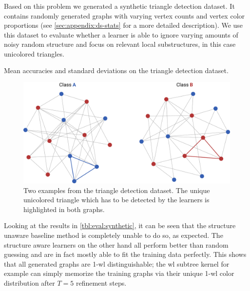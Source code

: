 Based on this problem we generated a synthetic triangle detection dataset.
It contains randomly generated graphs with varying vertex counts and vertex color proportions (see \cref{sec:appendix:ds-stats} for a more detailed description).
We use this dataset to evaluate whether a learner is able to ignore varying amounts of noisy random structure and focus on relevant local substructures, in this case unicolored triangles.
\begin{table}[t]
	\caption{Mean accuracies and standard deviations on the triangle detection dataset.}\label{tbl:eval:synthetic}
	\centering
\end{table}
\begin{figure}[t]
	\centering
	\includegraphics[width=0.7\linewidth]{gfx/evaluation/triangle-problem.pdf}
	\caption[Two example graphs from the triangle detection dataset.]{
		Two examples from the triangle detection dataset.
		The unique unicolored triangle which has to be detected by the learners is highlighted in both graphs.
	}\label{fig:evaluation:triangle-problem}
\end{figure}
Looking at the results in \cref{tbl:eval:synthetic}, it can be seen that the structure unaware baseline method is completely unable to do so, as expected.
The structure aware learners on the other hand all perform better than random guessing and are in fact mostly able to fit the training data perfectly.
This shows that all generated graphs are 1-\acs{wl} distinguishable; the \ac{wl} subtree kernel for example can simply memorize the training graphs via their unique 1-\acs{wl} color distribution after $T = 5$ refinement steps.

